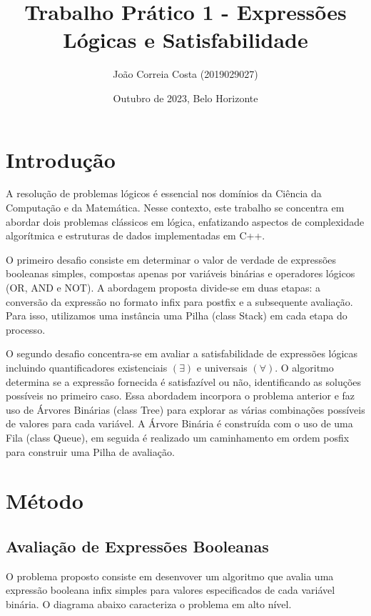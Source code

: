 \documentclass{article}
\title{Trabalho Prático 1 - Expressões Lógicas e Satisfabilidade}
\author{João Correia Costa (2019029027)}
\date{Outubro de 2023, Belo Horizonte}
\begin{document}
\maketitle

\section{Introdução}
A resolução de problemas lógicos é essencial nos domínios da Ciência da Computação e da Matemática. Nesse contexto, este trabalho se concentra em abordar dois problemas clássicos em lógica, enfatizando aspectos de complexidade algorítmica e estruturas de dados implementadas em C++.

O primeiro desafio consiste em determinar o valor de verdade de expressões booleanas simples, compostas apenas por variáveis binárias e operadores lógicos (OR, AND e NOT). A abordagem proposta divide-se em duas etapas: a conversão da expressão no formato infix para postfix e a subsequente avaliação. Para isso, utilizamos uma instância uma Pilha (class Stack) em cada etapa do processo.

O segundo desafio concentra-se em avaliar a satisfabilidade de expressões lógicas incluindo quantificadores existenciais $(\exists)$ e universais $(\forall)$. O algoritmo determina se a expressão fornecida é satisfazível ou não, identificando as soluções possíveis no primeiro caso. Essa abordadem incorpora o problema anterior e faz uso de Árvores Binárias (class Tree) para explorar as várias combinações possíveis de valores para cada variável. A Árvore Binária é construída com o uso de uma Fila (class Queue), em seguida é realizado um caminhamento em ordem posfix para construir uma Pilha de avaliação.

\section{Método}

\subsection{Avaliação de Expressões Booleanas}

O problema proposto consiste em desenvover um algoritmo que avalia uma expressão booleana infix simples para valores especificados de cada variável binária. O diagrama abaixo caracteriza o problema em alto nível. 

\begin{center}
\def\blockdist{2.3}
\def\edgedist{1}
\end{center}
\end{document}
